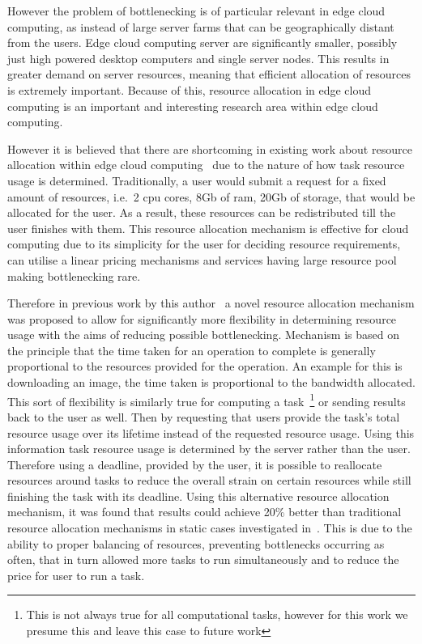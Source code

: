 However the problem of bottlenecking is of particular relevant in edge cloud computing, as instead of large server farms
that can be geographically distant from the users. Edge cloud computing server are significantly smaller, possibly
just high powered desktop computers and single server nodes. This results in greater demand on server resources,
meaning that efficient allocation of resources is extremely important. Because of this, resource allocation in edge
cloud computing is an important and interesting research area within edge cloud computing.

However it is believed that there are shortcoming in existing work about resource allocation within edge cloud
computing~\citep{vaji_infocom, Bi2019} due to the nature of how task resource usage is determined. Traditionally,
a user would submit a request for a fixed amount of resources, i.e.\ 2 cpu cores, 8Gb of ram, 20Gb of storage, that
would be allocated for the user. As a result, these resources can be redistributed till the user finishes with them.
This resource allocation mechanism is effective for cloud computing due to its simplicity for the user for  deciding
resource requirements, can utilise a linear pricing mechanisms and services having large resource pool making
bottlenecking rare.

Therefore in previous work by this author~\citep{FlexibleResourceAllocation} a novel resource allocation mechanism was
proposed to allow for significantly more flexibility in determining resource usage with the aims of reducing possible
bottlenecking. Mechanism is based on the principle that the time taken for an operation to complete is generally
proportional to the resources provided for the operation. An example for this is downloading an image, the time taken
is proportional to the bandwidth allocated. This sort of flexibility is similarly true for computing a
task~\footnote{This is not always true for all computational tasks, however for this work we presume this and leave
this case to future work} or sending results back to the user as well. Then by requesting that users provide the task's
total resource usage over its lifetime instead of the requested resource usage. Using this information task resource
usage is determined by the server rather than the user. Therefore using a deadline, provided by the user, it is possible
to reallocate resources around tasks to reduce the overall strain on certain resources while still finishing the task
with its deadline. Using this alternative resource allocation mechanism, it was found that results could achieve
20\% better than traditional resource allocation mechanisms in static cases investigated
in~\cite{FlexibleResourceAllocation}. This is due to the ability to proper balancing of resources, preventing
bottlenecks occurring as often, that in turn allowed more tasks to run simultaneously and to reduce the price for user
to run a task.


